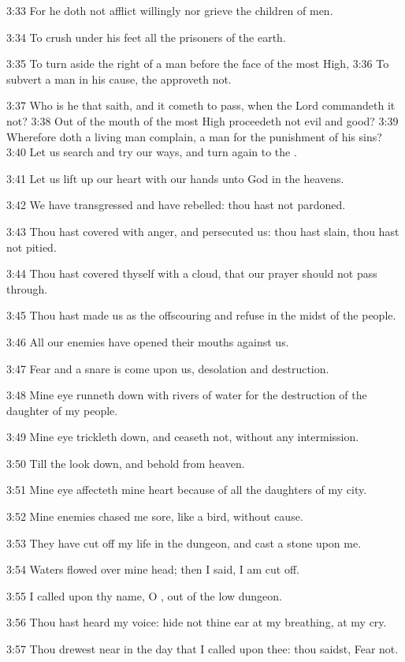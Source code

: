 3:33 For he doth not afflict willingly nor grieve the children of men.

3:34 To crush under his feet all the prisoners of the earth.

3:35 To turn aside the right of a man before the face of the most High, 3:36 To subvert a man in his cause, the \LORD approveth not.

3:37 Who is he that saith, and it cometh to pass, when the Lord commandeth it not?  3:38 Out of the mouth of the most High proceedeth not evil and good?  3:39 Wherefore doth a living man complain, a man for the punishment of his sins?  3:40 Let us search and try our ways, and turn again to the \LORD.

3:41 Let us lift up our heart with our hands unto God in the heavens.

3:42 We have transgressed and have rebelled: thou hast not pardoned.

3:43 Thou hast covered with anger, and persecuted us: thou hast slain, thou hast not pitied.

3:44 Thou hast covered thyself with a cloud, that our prayer should not pass through.

3:45 Thou hast made us as the offscouring and refuse in the midst of the people.

3:46 All our enemies have opened their mouths against us.

3:47 Fear and a snare is come upon us, desolation and destruction.

3:48 Mine eye runneth down with rivers of water for the destruction of the daughter of my people.

3:49 Mine eye trickleth down, and ceaseth not, without any intermission.

3:50 Till the \LORD look down, and behold from heaven.

3:51 Mine eye affecteth mine heart because of all the daughters of my city.

3:52 Mine enemies chased me sore, like a bird, without cause.

3:53 They have cut off my life in the dungeon, and cast a stone upon me.

3:54 Waters flowed over mine head; then I said, I am cut off.

3:55 I called upon thy name, O \LORD, out of the low dungeon.

3:56 Thou hast heard my voice: hide not thine ear at my breathing, at my cry.

3:57 Thou drewest near in the day that I called upon thee: thou saidst, Fear not.

